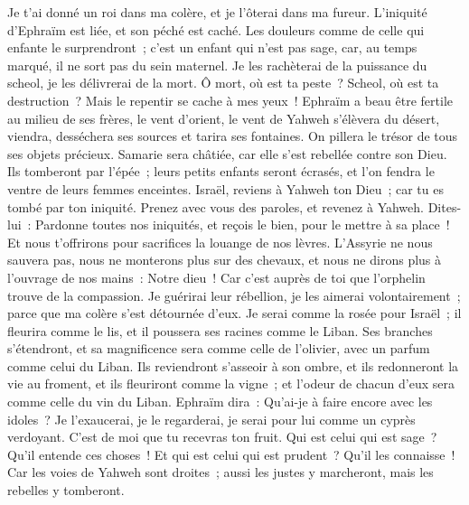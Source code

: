 \begin{multicols}{2}
Je t'ai donné un roi dans ma colère, et je l'ôterai dans ma fureur.
L'iniquité d'Ephraïm est liée, et son péché est caché.
Les douleurs comme de celle qui enfante le surprendront~; c'est un enfant qui n'est pas sage, car, au temps marqué, il ne sort pas du sein maternel.
Je les rachèterai de la puissance du scheol, je les délivrerai de la mort. Ô mort, où est ta peste~? Scheol, où est ta destruction~? Mais le repentir se cache à mes yeux~!
Ephraïm a beau être fertile au milieu de ses frères, le vent d'orient, le vent de Yahweh s'élèvera du désert, viendra, desséchera ses sources et tarira ses fontaines. On pillera le trésor de tous ses objets précieux.
Samarie sera châtiée, car elle s'est rebellée contre son Dieu. Ils tomberont par l'épée~; leurs petits enfants seront écrasés, et l'on fendra le ventre de leurs femmes enceintes.
\VerseOne{}Israël, reviens à Yahweh ton Dieu~; car tu es tombé par ton iniquité.
Prenez avec vous des paroles, et revenez à Yahweh. Dites-lui~: Pardonne toutes nos iniquités, et reçois le bien, pour le mettre à sa place~! Et nous t'offrirons pour sacrifices la louange de nos lèvres.
L'Assyrie ne nous sauvera pas, nous ne monterons plus sur des chevaux, et nous ne dirons plus à l'ouvrage de nos mains~: Notre dieu~! Car c'est auprès de toi que l'orphelin trouve de la compassion.
Je guérirai leur rébellion, je les aimerai volontairement~; parce que ma colère s'est détournée d'eux.
Je serai comme la rosée pour Israël~; il fleurira comme le lis, et il poussera ses racines comme le Liban.
Ses branches s'étendront, et sa magnificence sera comme celle de l'olivier, avec un parfum comme celui du Liban.
Ils reviendront s'asseoir à son ombre, et ils redonneront la vie au froment, et ils fleuriront comme la vigne~; et l'odeur de chacun d'eux sera comme celle du vin du Liban.
Ephraïm dira~: Qu'ai-je à faire encore avec les idoles~? Je l'exaucerai, je le regarderai, je serai pour lui comme un cyprès verdoyant. C'est de moi que tu recevras ton fruit.
Qui est celui qui est sage~? Qu'il entende ces choses~! Et qui est celui qui est prudent~? Qu'il les connaisse~! Car les voies de Yahweh sont droites~; aussi les justes y marcheront, mais les rebelles y tomberont.
\PPE{}
\end{multicols}
